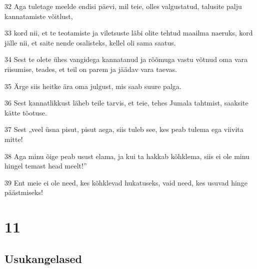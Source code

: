 \par 32 Aga tuletage meelde endisi päevi, mil teie, olles valgustatud, talusite palju kannatamiste võitlust,
\par 33 kord nii, et te teotamiste ja viletsuste läbi olite tehtud maailma naeruks, kord jälle nii, et saite nende osalisteks, kellel oli sama saatus.
\par 34 Sest te olete ühes vangidega kannatanud ja rõõmuga vastu võtnud oma vara riisumise, teades, et teil on parem ja jäädav vara taevas.
\par 35 Ärge siis heitke ära oma julgust, mis saab suure palga.
\par 36 Sest kannatlikkust läheb teile tarvis, et teie, tehes Jumala tahtmist, saaksite kätte tõotuse.
\par 37 Sest „veel üsna pisut, pisut aega, siis tuleb see, kes peab tulema ega viivita mitte!
\par 38 Aga minu õige peab usust elama, ja kui ta hakkab kõhklema, siis ei ole minu hingel temast head meelt!”
\par 39 Ent meie ei ole need, kes kõhklevad hukatuseks, vaid need, kes usuvad hinge päästmiseks!


\chapter{11}

\section*{Usukangelased}

